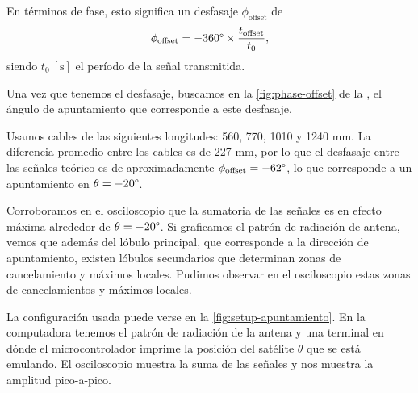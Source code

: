 \documentclass{article}
\newenvironment{standalone}{\begin{preview}}{\end{preview}}
\begin{document}
\begin{standalone}
  En términos de fase, esto significa un desfasaje $\phi_{\text{offset}}$ de
  \begin{equation}
    \phi_{\text{offset}} = - 360\degree \times \frac{t_{\text{offset}}}{t_0},
    \tagaddtext{[\si{\degree}]}
  \end{equation}
  siendo $t_0 \ [\si{\second}]$ el período de la señal transmitida.

  Una vez que tenemos el desfasaje, buscamos en la \cref{fig:phase-offset} de la , el ángulo de apuntamiento que corresponde a este desfasaje.

  Usamos cables de las siguientes longitudes: 560, 770, 1010 y 1240 mm.
  La diferencia promedio entre los cables es de 227 mm, por lo que el desfasaje entre las señales teórico es de aproximadamente $\phi_{\text{offset}} = - 62\degree$, lo que corresponde a un apuntamiento en $\theta = -20\degree$.

  Corroboramos en el osciloscopio que la sumatoria de las señales es en efecto máxima alrededor de $\theta = -20\degree$.
  Si graficamos el patrón de radiación de antena, vemos que además del lóbulo principal, que corresponde a la dirección de apuntamiento, existen lóbulos secundarios que determinan zonas de cancelamiento y máximos locales.
  Pudimos observar en el osciloscopio estas zonas de cancelamientos y máximos locales.

  La configuración usada puede verse en la \cref{fig:setup-apuntamiento}.
  En la computadora tenemos el patrón de radiación de la antena y una terminal en dónde el microcontrolador imprime la posición del satélite $\theta$ que se está emulando.
  El osciloscopio muestra la suma de las señales y nos muestra la amplitud pico-a-pico.

  \begin{figure}[!htbp]
    \centering


\end{figure}
\end{standalone}
\end{document}
